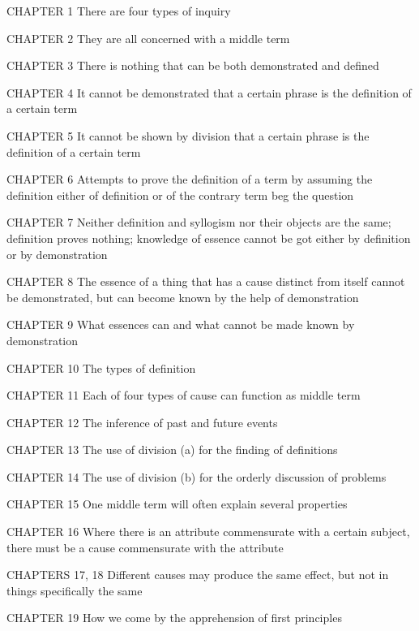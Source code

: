 CHAPTER 1
There are four types of inquiry

CHAPTER 2
They are all concerned with a middle term

CHAPTER 3
There is nothing that can be both demonstrated and defined

CHAPTER 4
It cannot be demonstrated that a certain phrase is the definition
of a certain term

CHAPTER 5
It cannot be shown by division that a certain phrase is the
definition of a certain term

CHAPTER 6
Attempts to prove the definition of a term by assuming the definition
either of definition or of the contrary term beg the question

CHAPTER 7
Neither definition and syllogism nor their objects are the same;
definition proves nothing; knowledge of essence cannot be got either
by definition or by demonstration

CHAPTER 8
The essence of a thing that has a cause distinct from itself cannot be
demonstrated, but can become known by the help of demonstration

CHAPTER 9
What essences can and what cannot be made known by demonstration

CHAPTER 10
The types of definition

CHAPTER 11
Each of four types of cause can function as middle term

CHAPTER 12
The inference of past and future events

CHAPTER 13
The use of division (a) for the finding of definitions

CHAPTER 14
The use of division (b) for the orderly discussion of problems

CHAPTER 15
One middle term will often explain several properties

CHAPTER 16
Where there is an attribute commensurate with a certain subject,
there must be a cause commensurate with the attribute

CHAPTERS 17, 18
Different causes may produce the same effect, but not in things
specifically the same

CHAPTER 19
How we come by the apprehension of first principles

